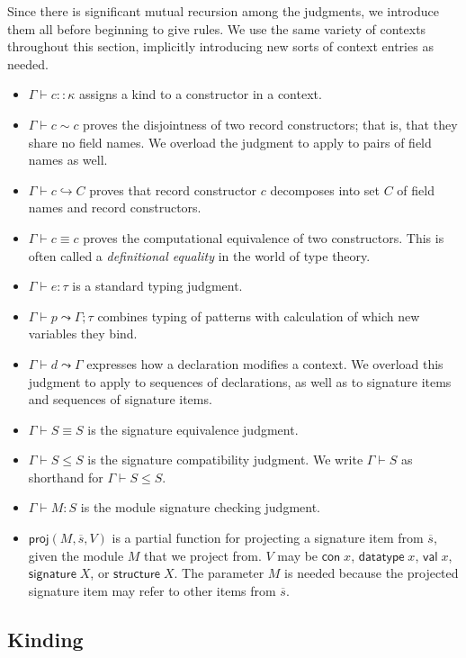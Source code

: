 \documentclass{article}
\newcommand{\mt}[1]{\mathsf{#1}}
\begin{document}
Since there is significant mutual recursion among the judgments, we introduce them all before beginning to give rules.  We use the same variety of contexts throughout this section, implicitly introducing new sorts of context entries as needed.
\begin{itemize}
\item $\Gamma \vdash c :: \kappa$ assigns a kind to a constructor in a context.
\item $\Gamma \vdash c \sim c$ proves the disjointness of two record constructors; that is, that they share no field names.  We overload the judgment to apply to pairs of field names as well.
\item $\Gamma \vdash c \hookrightarrow C$ proves that record constructor $c$ decomposes into set $C$ of field names and record constructors.
\item $\Gamma \vdash c \equiv c$ proves the computational equivalence of two constructors.  This is often called a \emph{definitional equality} in the world of type theory.
\item $\Gamma \vdash e : \tau$ is a standard typing judgment.
\item $\Gamma \vdash p \leadsto \Gamma; \tau$ combines typing of patterns with calculation of which new variables they bind.
\item $\Gamma \vdash d \leadsto \Gamma$ expresses how a declaration modifies a context.  We overload this judgment to apply to sequences of declarations, as well as to signature items and sequences of signature items.
\item $\Gamma \vdash S \equiv S$ is the signature equivalence judgment.
\item $\Gamma \vdash S \leq S$ is the signature compatibility judgment.  We write $\Gamma \vdash S$ as shorthand for $\Gamma \vdash S \leq S$.
\item $\Gamma \vdash M : S$ is the module signature checking judgment.
\item $\mt{proj}(M, \overline{s}, V)$ is a partial function for projecting a signature item from $\overline{s}$, given the module $M$ that we project from.  $V$ may be $\mt{con} \; x$, $\mt{datatype} \; x$, $\mt{val} \; x$, $\mt{signature} \; X$, or $\mt{structure} \; X$.  The parameter $M$ is needed because the projected signature item may refer to other items from $\overline{s}$.
\end{itemize}

\subsection{Kinding}
\end{document}
